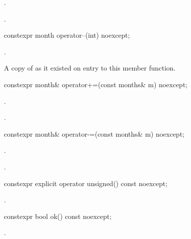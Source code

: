 \begin{itemdescr}
\pnum
\effects
{}.

\pnum
\returns
{}.
\end{itemdescr}

%
\begin{itemdecl}
constexpr month operator--(int) noexcept;
\end{itemdecl}

\begin{itemdescr}
\pnum
\effects
{}.

\pnum
\returns
A copy of  as it existed on entry to this member function.
\end{itemdescr}

%
\begin{itemdecl}
constexpr month& operator+=(const months& m) noexcept;
\end{itemdecl}

\begin{itemdescr}
\pnum
\effects
{}.

\pnum
\returns
{}.
\end{itemdescr}

%
\begin{itemdecl}
constexpr month& operator-=(const months& m) noexcept;
\end{itemdecl}

\begin{itemdescr}
\pnum
\effects
{}.

\pnum
\returns
{}.
\end{itemdescr}

%
\begin{itemdecl}
constexpr explicit operator unsigned() const noexcept;
\end{itemdecl}

\begin{itemdescr}
\pnum
\returns
{}.
\end{itemdescr}

%
\begin{itemdecl}
constexpr bool ok() const noexcept;
\end{itemdecl}

\begin{itemdescr}
\pnum
\returns
{}.
\end{itemdescr}

